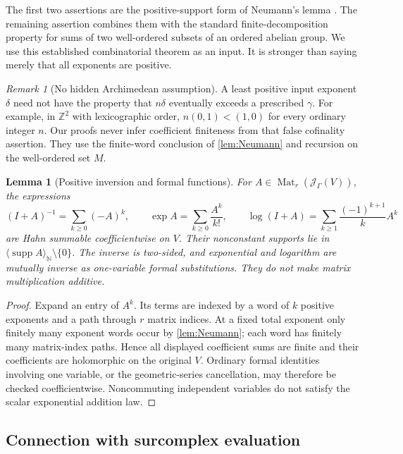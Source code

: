 \documentclass[11pt,letterpaper]{article}
\newtheorem{lemma}[lemma]{Lemma}
\theoremstyle{definition}
\theoremstyle{remark}
\newtheorem{remark}[remark]{Remark}
\newcommand{\Z}{\mathbb Z}
\newcommand{\N}{\mathbb N}
\newcommand{\JJ}{\mathscr J_\Gamma}
\newcommand{\Mat}{\operatorname{Mat}}
\newcommand{\supp}{\operatorname{supp}}
\newcommand{\angles}[1]{\langle #1\rangle_{\N}}
\numberwithin{equation}{section}
\begin{document}
The first two assertions are the positive-support form of Neumann's lemma \cite{Neumann}. The remaining assertion combines them with the standard finite-decomposition property for sums of two well-ordered subsets of an ordered abelian group. We use this established combinatorial theorem as an input. It is stronger than saying merely that all exponents are positive.

\begin{remark}[No hidden Archimedean assumption]\label{rem:nonarch}
A least positive input exponent $\delta$ need not have the property that $n\delta$ eventually exceeds a prescribed $\gamma$. For example, in $\Z^2$ with lexicographic order, $n(0,1)<(1,0)$ for every ordinary integer $n$. Our proofs never infer coefficient finiteness from that false cofinality assertion. They use the finite-word conclusion of \cref{lem:Neumann} and recursion on the well-ordered set $M$.
\end{remark}

\begin{lemma}[Positive inversion and formal functions]\label{lem:inverse}
For $A\in\Mat_r(\JJ(V))$, the expressions
\[
 (I+A)^{-1}=\sum_{k\geq0}(-A)^k,
 \qquad
 \exp A=\sum_{k\geq0}\frac{A^k}{k!},
 \qquad
 \log(I+A)=\sum_{k\geq1}\frac{(-1)^{k+1}}{k}A^k
\]
are Hahn summable coefficientwise on $V$. Their nonconstant supports lie in $\angles{\supp A}\setminus\{0\}$. The inverse is two-sided, and exponential and logarithm are mutually inverse as one-variable formal substitutions. They do not make matrix multiplication additive.
\end{lemma}

\begin{proof}
Expand an entry of $A^k$. Its terms are indexed by a word of $k$ positive exponents and a path through $r$ matrix indices. At a fixed total exponent only finitely many exponent words occur by \cref{lem:Neumann}; each word has finitely many matrix-index paths. Hence all displayed coefficient sums are finite and their coefficients are holomorphic on the original $V$. Ordinary formal identities involving one variable, or the geometric-series cancellation, may therefore be checked coefficientwise. Noncommuting independent variables do not satisfy the scalar exponential addition law.
\end{proof}

\subsection{Connection with surcomplex evaluation}
\end{document}
